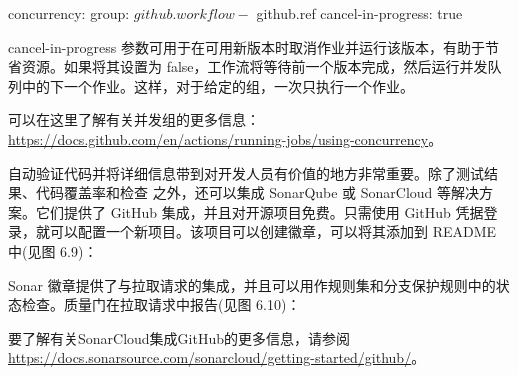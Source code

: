 \begin{shell}
concurrency:
  group: ${{ github.workflow }}-${{ github.ref }}
  cancel-in-progress: true
\end{shell}

cancel-in-progress 参数可用于在可用新版本时取消作业并运行该版本，有助于节省资源。如果将其设置为 false，工作流将等待前一个版本完成，然后运行并发队列中的下一个作业。这样，对于给定的组，一次只执行一个作业。

可以在这里了解有关并发组的更多信息：\url{https://docs.github.com/en/actions/running-jobs/using-concurrency}。


自动验证代码并将详细信息带到对开发人员有价值的地方非常重要。除了测试结果、代码覆盖率和检查 之外，还可以集成 SonarQube 或 SonarCloud 等解决方案。它们提供了 GitHub 集成，并且对开源项目免费。只需使用 GitHub 凭据登录，就可以配置一个新项目。该项目可以创建徽章，可以将其添加到 README 中(见图 6.9)：


Sonar 徽章提供了与拉取请求的集成，并且可以用作规则集和分支保护规则中的状态检查。质量门在拉取请求中报告(见图 6.10)：


要了解有关SonarCloud集成GitHub的更多信息，请参阅\url{https://docs.sonarsource.com/sonarcloud/getting-started/github/}。














